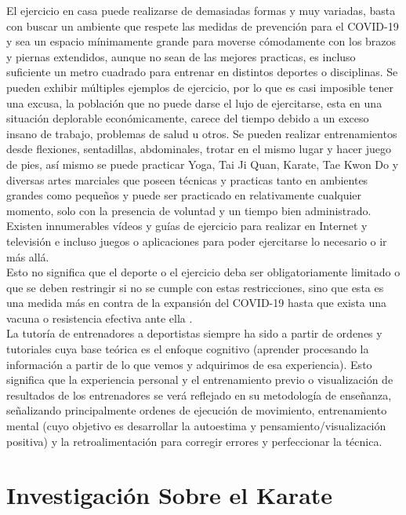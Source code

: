 El ejercicio en casa puede realizarse de demasiadas formas y muy variadas, basta con buscar un ambiente que respete las medidas de prevención para el COVID-19 y sea un espacio mínimamente grande para moverse cómodamente con los brazos y piernas extendidos, aunque no sean de las mejores practicas, es incluso suficiente un metro cuadrado para entrenar en distintos deportes o disciplinas. Se pueden exhibir múltiples ejemplos de ejercicio, por lo que es casi imposible tener una excusa, la población que no puede darse el lujo de ejercitarse, esta en una situación deplorable económicamente, carece del tiempo debido a un exceso insano de trabajo, problemas de salud u otros.
Se pueden realizar entrenamientos desde flexiones, sentadillas, abdominales, trotar en el mismo lugar y hacer juego de pies, así mismo se puede practicar Yoga, Tai Ji Quan, Karate, Tae Kwon Do y diversas artes marciales que poseen técnicas y practicas tanto en ambientes grandes como pequeños y puede ser practicado en relativamente cualquier momento, solo con la presencia de voluntad y un tiempo bien administrado. Existen innumerables vídeos y guías de ejercicio para realizar en Internet y televisión e incluso juegos o aplicaciones para poder ejercitarse lo necesario o ir más allá.\\

Esto no significa que el deporte o el ejercicio deba ser obligatoriamente limitado o que se deben restringir si no se cumple con estas restricciones, sino que esta es una medida más en contra de la expansión del COVID-19 hasta que exista una vacuna o resistencia efectiva ante ella \cite{Chen}. \\

La tutoría de entrenadores a deportistas siempre ha sido a partir de ordenes y tutoriales cuya base teórica es el enfoque cognitivo (aprender procesando la información a partir de lo que vemos y adquirimos de esa experiencia). Esto significa que la experiencia personal y el entrenamiento previo o visualización de resultados de los entrenadores se verá reflejado en su metodología de enseñanza, señalizando principalmente ordenes de ejecución de movimiento, entrenamiento mental (cuyo objetivo es desarrollar la autoestima y pensamiento/visualización positiva) y la retroalimentación para corregir errores y perfeccionar la técnica\cite{raiola2017motor}. \\

\section{Investigación Sobre el Karate}

